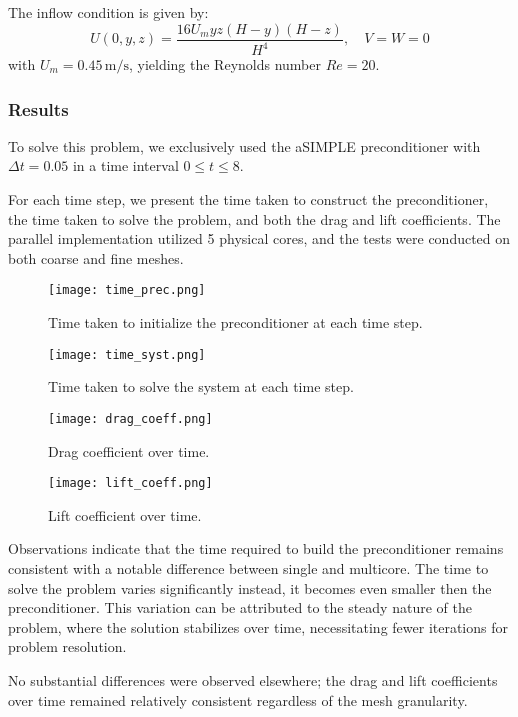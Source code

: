 \documentclass{article}
\begin{document}
The inflow condition is given by:
\[
U(0, y, z) = \frac{16U_m yz (H - y)(H - z)}{H^4}, \quad V = W = 0
\]
with \(U_m = 0.45 \, \text{m/s}\), yielding the Reynolds number \(Re = 20\). 

\subsubsection*{Results}

To solve this problem, we exclusively used the aSIMPLE preconditioner with \(\Delta t = 0.05\) in a time interval \(0 \leq t \leq 8\).

For each time step, we present the time taken to construct the preconditioner, the time taken to solve the problem, and both the drag and lift coefficients. The parallel implementation utilized 5 physical cores, and the tests were conducted on both coarse and fine meshes.

\begin{figure}[h]
    \centering
    \texttt{[image: time\_prec.png]}
    \caption{Time taken to initialize the preconditioner at each time step.}
\end{figure}

\begin{figure}[h]
    \centering
    \texttt{[image: time\_syst.png]}
    \caption{Time taken to solve the system at each time step.}
\end{figure}

\begin{figure}[h]
    \centering
    \texttt{[image: drag\_coeff.png]}
    \caption{Drag coefficient over time.}
\end{figure}

\begin{figure}[h]
    \centering
    \texttt{[image: lift\_coeff.png]}
    \caption{Lift coefficient over time.}
\end{figure}

Observations indicate that the time required to build the preconditioner remains consistent with a notable difference between single and multicore. 
The time to solve the problem varies significantly instead, it becomes even smaller then the preconditioner. This variation can be attributed to the steady nature of the problem, where the solution stabilizes over time, necessitating fewer iterations for problem resolution.

No substantial differences were observed elsewhere; the drag and lift coefficients over time remained relatively consistent regardless of the mesh granularity.
\end{document}
